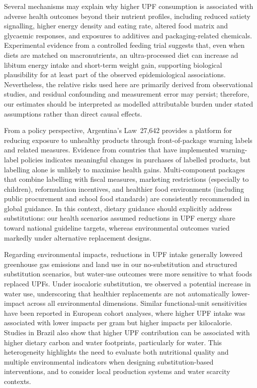 ﻿\documentclass{article}
\begin{document}
Several mechanisms may explain why higher UPF consumption is associated with adverse health outcomes beyond their nutrient profiles, including reduced satiety signalling, higher energy density and eating rate, altered food matrix and glycaemic responses, and exposures to additives and packaging-related chemicals.\cite{Lane2024BMJ,Yates2024} Experimental evidence from a controlled feeding trial suggests that, even when diets are matched on macronutrients, an ultra-processed diet can increase ad libitum energy intake and short-term weight gain,\cite{Hall2019} supporting biological plausibility for at least part of the observed epidemiological associations. Nevertheless, the relative risks used here are primarily derived from observational studies, and residual confounding and measurement error may persist; therefore, our estimates should be interpreted as modelled attributable burden under stated assumptions rather than direct causal effects.

From a policy perspective, Argentina's Law~27,642 provides a platform for reducing exposure to unhealthy products through front-of-package warning labels and related measures.\cite{ArgentinaLaw27642} Evidence from countries that have implemented warning-label policies indicates meaningful changes in purchases of labelled products,\cite{Taillie2020ChileLaw} but labelling alone is unlikely to maximise health gains. Multi-component packages that combine labelling with fiscal measures, marketing restrictions (especially to children), reformulation incentives, and healthier food environments (including public procurement and school food standards) are consistently recommended in global guidance.\cite{WHO2024FiscalGuideline} In this context, dietary guidance should explicitly address substitutions: our health scenarios assumed reductions in UPF energy share toward national guideline targets, whereas environmental outcomes varied markedly under alternative replacement designs.

Regarding environmental impacts, reductions in UPF intake generally lowered greenhouse gas emissions and land use in our no-substitution and structured substitution scenarios, but water-use outcomes were more sensitive to what foods replaced UPFs. Under isocaloric substitution, we observed a potential increase in water use, underscoring that healthier replacements are not automatically lower-impact across all environmental dimensions. Similar functional-unit sensitivities have been reported in European cohort analyses, where higher UPF intake was associated with lower impacts per gram but higher impacts per kilocalorie.\cite{Berden2025EPIC} Studies in Brazil also show that higher UPF contribution can be associated with higher dietary carbon and water footprints, particularly for water.\cite{Garzillo2022RSP} This heterogeneity highlights the need to evaluate both nutritional quality and multiple environmental indicators when designing substitution-based interventions, and to consider local production systems and water scarcity contexts.\cite{Anastasiou2022JCP}
\end{document}
